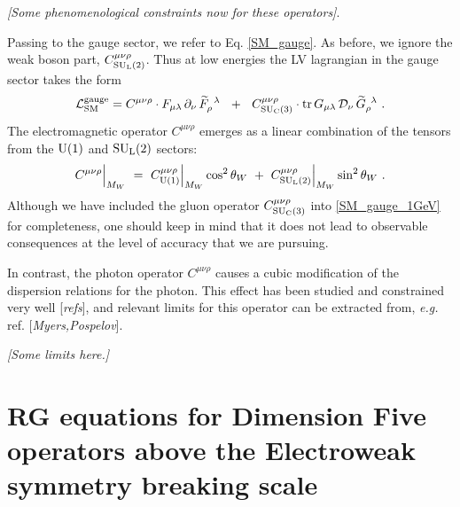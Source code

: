 \documentclass[12pt]{revtex4}
\newcommand{\wt}{\widetilde}
\newcommand{\suc}{{\rm SU}_{\rm C}(3)}
\newcommand{\sul}{{\rm SU}_{\rm L}(2)}
\newcommand{\ue}{{\rm U}(1)}
\begin{document}
	{\it [Some phenomenological constraints now for these operators]}.

	Passing to the gauge sector, we refer to Eq. \eqref{SM_gauge}.
	As before, we ignore the weak boson part, $ C_{\sul}^{\mu\nu\rho} $.
	Thus at low energies the LV lagrangian in the gauge sector
	takes the form
\begin{equation}
\label{SM_gauge_1GeV}
	\mathcal{L}_{\rm SM}^{\rm gauge} = 
	C^{\mu\nu\rho} \cdot 
	F_{\mu\lambda}\, \partial_\nu\, \wt{F}_\rho^{\phantom{\rho}\lambda}
	~~+~~
	C_{\suc}^{\mu\nu\rho} \cdot 
	{\rm tr}\,
	G_{\mu\lambda}\, \mathcal{D}_\nu\, \wt{G}_\rho^{\phantom{\rho}\lambda}
	~.
\end{equation}
	The electromagnetic operator
$ C^{\mu\nu\rho} $
	emerges as a linear combination of the tensors from the $ \ue $ 
	and $ \sul $ sectors:
\[
	C^{\mu\nu\rho}\Bigr|_{M_W} ~=~ 
		C^{\mu\nu\rho}_{\ue}\Bigr|_{M_W} \cos^2 \theta_W ~+~ 
		C^{\mu\nu\rho}_{\sul}\Bigr|_{M_W} \sin^2 \theta_W~.
\]
	Although we have included the gluon operator $ C_{\suc}^{\mu\nu\rho} $
	into \eqref{SM_gauge_1GeV} for completeness, one should keep in mind
	that it does not lead to observable consequences at the level
	of accuracy that we are pursuing.

	In contrast, the photon operator $ C^{\mu\nu\rho} $ causes a
	cubic modification of the dispersion relations for the photon.
	This effect has been  studied and constrained very well [{\it refs}], 
	and relevant limits for this operator can be extracted from, 
	{\it e.g.} ref. [{\it Myers,Pospelov}].

	{\it [Some limits here.]}


\newpage
%
%
\appendix
\section{RG equations for Dimension Five operators 
	above the Electroweak symmetry breaking scale}
\label{RG_SM}
\end{document}
